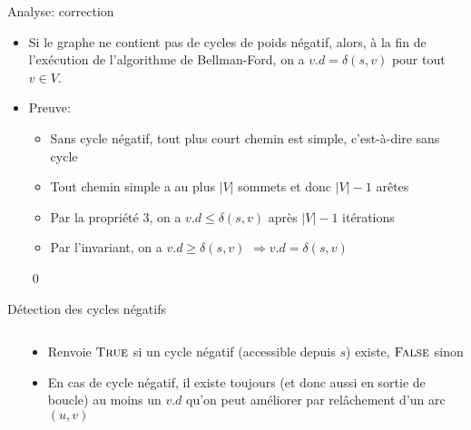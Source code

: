 \begin{frame}{Analyse: correction}

\begin{itemize}
\item Si le graphe ne contient pas de cycles de poids négatif, alors,
  à la fin de l'exécution de l'algorithme de Bellman-Ford, on a
  $v.d=\delta(s,v)$ pour tout $v\in V$.

\bigskip

\item Preuve:
\begin{itemize}
\item Sans cycle négatif, tout plus court chemin est \alert{simple}, c'est-à-dire sans cycle
\item Tout chemin simple a au plus $|V|$ sommets et donc $|V|-1$ arêtes
\item Par la propriété 3, on a $v.d\leq \delta(s,v)$ après 
$|V|-1$ itérations
\item Par l'invariant, on a $v.d\geq \delta(s,v)$ $\Rightarrow v.d=\delta(s,v)$
\end{itemize}\qed
\end{itemize}
\end{frame}

\begin{frame}{Détection des cycles négatifs}

\begin{columns}
\begin{column}{4.5cm}
\begin{center}
{\small
{}}
\end{center}
\end{column}
\begin{column}{5.5cm}
\begin{itemize}
\item Renvoie $\textnormal{\scshape True}$ si un cycle négatif (accessible depuis
  $s$) existe, $\textnormal{\scshape False}$ sinon
\item En cas de cycle négatif, il existe toujours (et donc aussi en sortie de boucle) au moins un $v.d$ qu'on
  peut améliorer par relâchement d'un arc $(u,v)$
\end{itemize}
\end{column}
\end{columns}

\end{frame}

